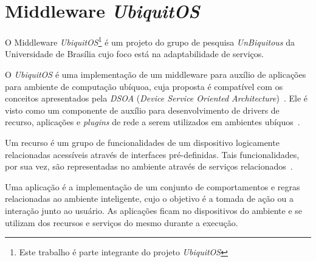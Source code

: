 \section{Middleware \textit{UbiquitOS}}
\label{uos}

	O Middleware \textit{UbiquitOS}\footnote{Este trabalho é parte integrante do projeto \textit{UbiquitOS}} é um projeto do grupo de pesquisa \textit{UnBiquitous} da Universidade de Brasília cujo foco está na adaptabilidade de serviços.

	O \textit{UbiquitOS} é uma implementação de um middleware para auxílio de aplicações para ambiente de computação ubíquoa, cuja proposta é compatível com os conceitos apresentados pela \textit{DSOA} (\textit{Device Service Oriented Architecture})~\cite{fabriciobuzzeto}. Ele é visto como um componente de auxílio para desenvolvimento de drivers de recurso, aplicações e \textit{plugins} de rede a serem utilizados em ambientes ubíquos~\cite{fabriciobuzzeto}.

	Um recurso é um grupo de funcionalidades de um dispositivo logicamente relacionadas acessíveis através de interfaces pré-definidas. Tais funcionalidades, por sua vez, são representadas no ambiente através de serviços relacionados~\cite{fabriciobuzzeto}.

	Uma aplicação é a implementação de um conjunto de comportamentos e regras relacionadas ao ambiente inteligente, cujo o objetivo é a tomada de ação ou a interação junto ao usuário. As aplicações ficam no dispositivos do ambiente e se utilizam dos recursos e serviços do mesmo durante a execução.

